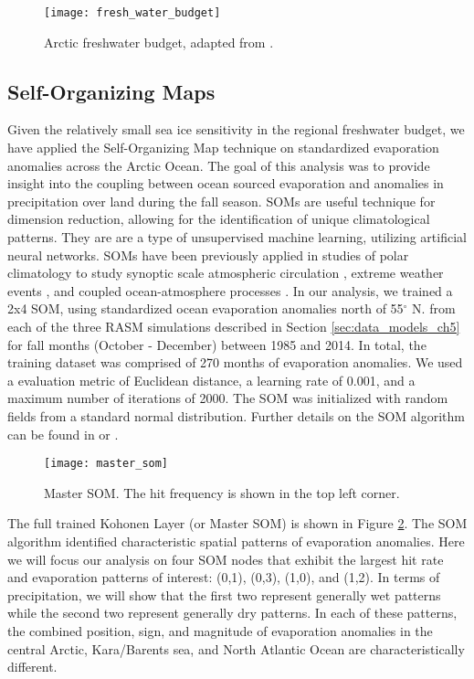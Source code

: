 \begin{figure}
  \centering
  \texttt{[image: fresh\_water\_budget]}
  \caption{Arctic freshwater budget, adapted from \citet{Serreze_2006a}.}
  \label{fig:fwb}
\end{figure}

\subsection{Self-Organizing Maps}
\label{sec:soms}
Given the relatively small sea ice sensitivity in the regional freshwater budget, we have applied the Self-Organizing Map \citep{Kohonen_1998,Hewitson_2002} technique on standardized evaporation anomalies across the Arctic Ocean.
The goal of this analysis was to provide insight into the coupling between ocean sourced evaporation and anomalies in precipitation over land during the fall season.
SOMs are useful technique for dimension reduction, allowing for the identification of unique climatological patterns.
They are are a type of unsupervised machine learning, utilizing artificial neural networks.
SOMs have been previously applied in studies of polar climatology to study synoptic scale atmospheric circulation \citep[e.g. ][]{Cassano_2007}, extreme weather events \citep[e.g. ][]{Cassano_2015,Glisan_2016}, and coupled ocean-atmosphere processes \citep[e.g. ][]{DuVivier_2016}.
In our analysis, we trained a 2x4 SOM, using standardized ocean evaporation anomalies north of 55$^{\circ}$ N. from each of the three RASM simulations described in Section \ref{sec:data_models_ch5} for fall months (October - December) between 1985 and 2014.
In total, the training dataset was comprised of 270 months of evaporation anomalies.
We used a evaluation metric of Euclidean distance, a learning rate of 0.001, and a maximum number of iterations of 2000.
The SOM was initialized with random fields from a standard normal distribution.
Further details on the SOM algorithm can be found in \citet{Reusch_2005} or \citet{Cassano_2015}.

\begin{figure}
  \centering
  \texttt{[image: master\_som]}
  \caption{Master SOM. The hit frequency is shown in the top left corner.}
  \label{fig:master_som}
\end{figure}

The full trained Kohonen Layer (or Master SOM) is shown in Figure \ref{fig:master_som}.
The SOM algorithm identified characteristic spatial patterns of evaporation anomalies.
Here we will focus our analysis on four SOM nodes that exhibit the largest hit rate and evaporation patterns of interest: (0,1), (0,3), (1,0), and (1,2).
In terms of precipitation, we will show that the first two represent generally wet patterns while the second two represent generally dry patterns.
In each of these patterns, the combined position, sign, and magnitude of evaporation anomalies in the central Arctic, Kara/Barents sea, and North Atlantic Ocean are characteristically different.

